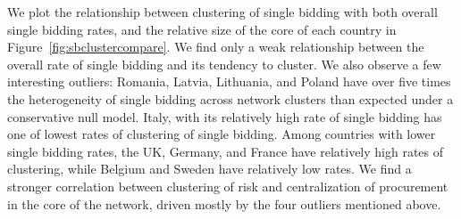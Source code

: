 We plot the relationship between clustering of single bidding with both overall single bidding rates, and the relative size of the core of each country in Figure~\ref{fig:sbclustercompare}. We find only a weak relationship between the overall rate of single bidding and its tendency to cluster. We also observe a few interesting outliers: Romania, Latvia, Lithuania, and Poland have over five times the heterogeneity of single bidding across network clusters than expected under a conservative null model. Italy, with its relatively high rate of single bidding has one of lowest rates of clustering of single bidding. Among countries with lower single bidding rates, the UK, Germany, and France have relatively high rates of clustering, while Belgium and Sweden have relatively low rates. We find a stronger correlation between clustering of risk and centralization of procurement in the core of the network, driven mostly by the four outliers mentioned above.

